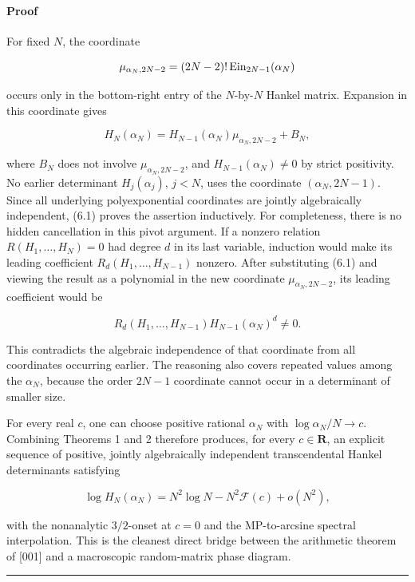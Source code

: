 \paragraph{Proof}

For fixed \(N\), the coordinate

\[
\mu_{\alpha_N,2N-2}=(2N-2)!\operatorname{Ein}_{2N-1}(\alpha_N)
\]

occurs only in the bottom-right entry of the \(N\)-by-\(N\) Hankel matrix.
Expansion in this coordinate gives

\[
H_N(\alpha_N)
=H_{N-1}(\alpha_N)\mu_{\alpha_N,2N-2}+B_N, \tag{DS-6.1}
\]

where \(B_N\) does not involve \(\mu_{\alpha_N,2N-2}\), and
\(H_{N-1}(\alpha_N)\ne0\) by strict positivity. No earlier determinant
\(H_j(\alpha_j)\), \(j<N\), uses the coordinate
\((\alpha_N,2N-1)\). Since all underlying polyexponential coordinates are
jointly algebraically independent, (6.1) proves the assertion inductively.
For completeness, there is no hidden cancellation in this pivot argument.
If a nonzero relation \(R(H_1,\ldots,H_N)=0\) had degree \(d\) in its last
variable, induction would make its leading coefficient
\(R_d(H_1,\ldots,H_{N-1})\) nonzero. After substituting (6.1) and viewing
the result as a polynomial in the new coordinate
\(\mu_{\alpha_N,2N-2}\), its leading coefficient would be

\[
R_d(H_1,\ldots,H_{N-1})H_{N-1}(\alpha_N)^d\ne0.
\]

This contradicts the algebraic independence of that coordinate from all
coordinates occurring earlier. The reasoning also covers repeated values
among the \(\alpha_N\), because the order \(2N-1\) coordinate cannot occur
in a determinant of smaller size.

For every real \(c\), one can choose positive rational \(\alpha_N\) with
\(\log\alpha_N/N\to c\). Combining Theorems 1 and 2 therefore produces,
for every \(c\in\mathbf R\), an explicit sequence of positive, jointly
algebraically independent transcendental Hankel determinants satisfying

\[
\log H_N(\alpha_N)
=N^2\log N-N^2\mathcal F(c)+o(N^2),
\]

with the nonanalytic \(3/2\)-onset at \(c=0\) and the MP-to-arcsine
spectral interpolation. This is the cleanest direct bridge between the
arithmetic theorem of {[}001{]} and a macroscopic random-matrix phase diagram.

\begin{center}\rule{0.5\linewidth}{0.5pt}\end{center}

